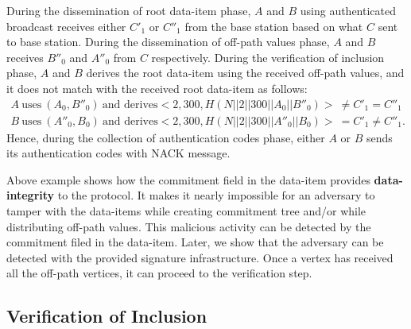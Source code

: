 \begin{exmp}
			During the dissemination of root data-item phase, $A$ and $B$ using authenticated broadcast receives either $C'_{1}$ or $C''_{1}$ from the base station based on what $C$ sent to base station.
			During the dissemination of off-path values phase, $A$ and $B$ receives $B''_{0}$ and $A''_{0}$ from $C$ respectively.
			During the verification of inclusion phase, $A$ and $B$ derives the root data-item using the received off-path values, and it does not match with the received root data-item as follows:
			\begin{equation*}
				\begin{array}{l}
					A\ \mbox{uses}\ (A_{0}, B''_{0})\ \mbox{and derives} <2,300,H(N||2||300||A_{0}||B''_{0})>\  \neq C'_{1} = C''_{1}\\
					B\ \mbox{uses}\ (A''_{0}, B_{0})\ \mbox{and derives} <2,300,H(N||2||300||A''_{0}||B_{0})>\  = C'_{1} \neq C''_{1}.
				\end{array}
			\end{equation*}
			Hence, during the collection of authentication codes phase, either $A$ or $B$ sends its authentication codes with NACK message.
		\end{exmp}
			Above example shows how the commitment field in the data-item provides \textbf{data-integrity} to the protocol.
			It makes it nearly impossible for an adversary to tamper with the data-items while creating commitment tree and/or while distributing off-path values.
			This malicious activity can be detected by the commitment filed in the data-item.
			Later, we show that the adversary can be detected with the provided signature infrastructure.
			Once a vertex has received all the off-path vertices, it can proceed to the verification step.
	
	\subsection{Verification of Inclusion}
	
